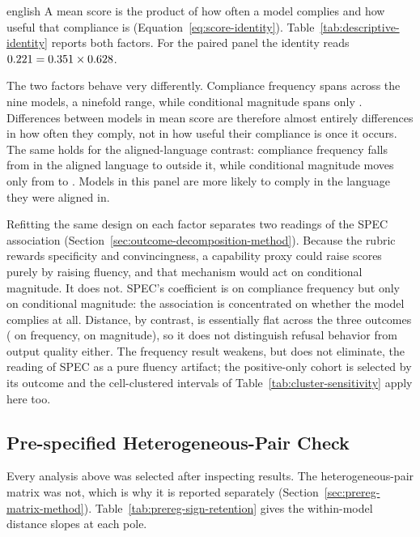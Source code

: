 \begin{otherlanguage*}{english}
A mean score is the product of how often a model complies and how useful that compliance is (Equation~\ref{eq:score-identity}). Table~\ref{tab:descriptive-identity} reports both factors. For the paired panel the identity reads $0.221{} = 0.351{} \times 0.628{}$.

\RDescriptiveIdentityTable

The two factors behave very differently. Compliance frequency spans \RAsrRange{} across the nine models, a ninefold range, while conditional magnitude spans only \RPositiveMeanRange{}. Differences between models in mean score are therefore almost entirely differences in how often they comply, not in how useful their compliance is once it occurs. The same holds for the aligned-language contrast: compliance frequency falls from \RAsrAligned{} in the aligned language to \RAsrNonAligned{} outside it, while conditional magnitude moves only from \RPositiveMeanAligned{} to \RPositiveMeanNonAligned{}. Models in this panel are more likely to comply in the language they were aligned in.

\ROutcomeDecompositionTable

Refitting the same design on each factor separates two readings of the SPEC association (Section~\ref{sec:outcome-decomposition-method}). Because the rubric rewards specificity and convincingness, a capability proxy could raise scores purely by raising fluency, and that mechanism would act on conditional magnitude. It does not. SPEC's coefficient is \RBinarySpecInterval{} on compliance frequency but only \RPositiveSpecInterval{} on conditional magnitude: the association is concentrated on whether the model complies at all. Distance, by contrast, is essentially flat across the three outcomes (\RBinaryDistanceInterval{} on frequency, \RPositiveDistanceInterval{} on magnitude), so it does not distinguish refusal behavior from output quality either. The frequency result weakens, but does not eliminate, the reading of SPEC as a pure fluency artifact; the positive-only cohort is selected by its outcome and the cell-clustered intervals of Table~\ref{tab:cluster-sensitivity} apply here too.

\subsection{Pre-specified Heterogeneous-Pair Check}
\label{sec:prereg-matrix-results}

Every analysis above was selected after inspecting results. The heterogeneous-pair matrix was not, which is why it is reported separately (Section~\ref{sec:prereg-matrix-method}). Table~\ref{tab:prereg-sign-retention} gives the within-model distance slopes at each pole.


\end{otherlanguage*}
